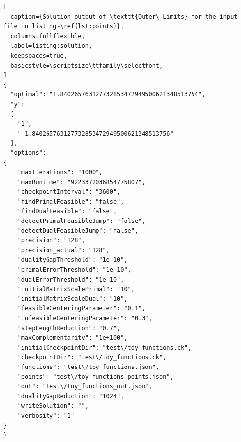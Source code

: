 \documentclass[12pt]{article}
\numberwithin{equation}{section}
\begin{document}
\begin{lstlisting}[
  caption={Solution output of \texttt{Outer\_Limits} for the input file in listing~\ref{lst:points}},
  columns=fullflexible,
  label=listing:solution,
  keepspaces=true,
  basicstyle=\scriptsize\ttfamily\selectfont,
]
{
  "optimal": "1.840265763127732853472949500621348513754",
  "y":
  [
    "1",
    "-1.840265763127732853472949500621348513756"
  ],
  "options": 
{
    "maxIterations": "1000",
    "maxRuntime": "9223372036854775807",
    "checkpointInterval": "3600",
    "findPrimalFeasible": "false",
    "findDualFeasible": "false",
    "detectPrimalFeasibleJump": "false",
    "detectDualFeasibleJump": "false",
    "precision": "128",
    "precision_actual": "128",
    "dualityGapThreshold": "1e-10",
    "primalErrorThreshold": "1e-10",
    "dualErrorThreshold": "1e-10",
    "initialMatrixScalePrimal": "10",
    "initialMatrixScaleDual": "10",
    "feasibleCenteringParameter": "0.1",
    "infeasibleCenteringParameter": "0.3",
    "stepLengthReduction": "0.7",
    "maxComplementarity": "1e+100",
    "initialCheckpointDir": "test\/toy_functions.ck",
    "checkpointDir": "test\/toy_functions.ck",
    "functions": "test\/toy_functions.json",
    "points": "test\/toy_functions_points.json",
    "out": "test\/toy_functions_out.json",
    "dualityGapReduction": "1024",
    "writeSolution": "",
    "verbosity": "1"
}
}
\end{lstlisting}
\end{document}
